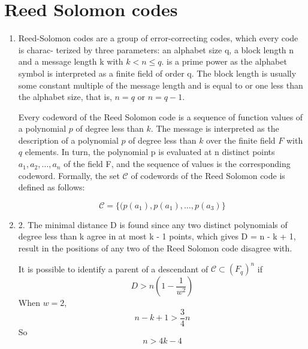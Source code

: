 \documentclass{article}
\begin{document}
	\section{Reed Solomon codes}
	\begin{enumerate}
		\item
		Reed-Solomon codes are a group of error-correcting codes, which every code is charac- terized by three parameters: an alphabet size q, a block length n and a message length k with $k<n\leqslant q$. is a prime power as the alphabet symbol is interpreted as a finite field of order q.  The block length is usually some constant multiple of the message length and is equal to or one less than the alphabet size, that is, $n=q$ or $n=q-1$.
		
		Every codeword of the Reed Solomon code is a sequence of function values of a polynomial $p$ of degree less than $k$. The message is interpreted as the description of a polynomial $p$ of degree less than $k$ over the finite field $F$ with $q$ elements. In turn, the polynomial p is evaluated at n distinct points $a_1,a_2,\dots,a_n$ of the field F, and the sequence of values is the corresponding codeword. Formally, the set $\mathcal{C}$ of codewords of the Reed Solomon code is defined as follows:
		
		$$\mathcal{C}=\{(p(a_1),p(a_1),\dots,p(a_3)\}$$
		
		\item
		2. The minimal distance D is found since any two distinct polynomials of degree less than k agree in at most k - 1 points, which gives D = n - k + 1, result in the positions of any two of the Reed Solomon code disagree with.
		
		 It is possible to identify a parent of a descendant of $\mathcal{C}\subset(F_q)^n$ if
		$$D>n(1-\frac{1}{w^2})$$
		When $w=2$,
		$$n-k+1>\frac{3}{4}n$$
		So
		$$n>4k-4$$
	\end{enumerate}
	
\end{document}
